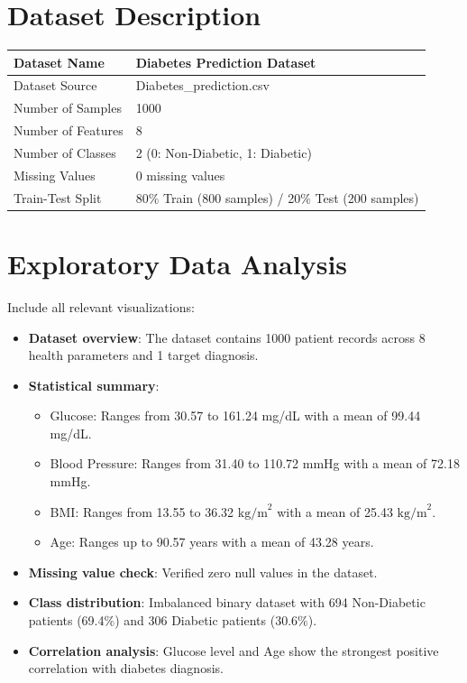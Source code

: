 \documentclass[12pt,a4paper]{article}
\begin{document}
\section{Dataset Description}
\begin{longtable}{|p{6cm}|p{8cm}|}
\hline
Dataset Name & Diabetes Prediction Dataset \\ \hline
Dataset Source & Diabetes\_prediction.csv \\ \hline
Number of Samples & 1000 \\ \hline
Number of Features & 8 \\ \hline
Number of Classes & 2 (0: Non-Diabetic, 1: Diabetic) \\ \hline
Missing Values & 0 missing values \\ \hline
Train-Test Split & 80\% Train (800 samples) / 20\% Test (200 samples) \\ \hline
\end{longtable}

\section{Exploratory Data Analysis}
Include all relevant visualizations:
\begin{itemize}
\item \textbf{Dataset overview}: The dataset contains 1000 patient records across 8 health parameters and 1 target diagnosis.
\item \textbf{Statistical summary}:
\begin{itemize}
\item Glucose: Ranges from 30.57 to 161.24 mg/dL with a mean of 99.44 mg/dL.
\item Blood Pressure: Ranges from 31.40 to 110.72 mmHg with a mean of 72.18 mmHg.
\item BMI: Ranges from 13.55 to 36.32 $\text{kg/m}^2$ with a mean of 25.43 $\text{kg/m}^2$.
\item Age: Ranges up to 90.57 years with a mean of 43.28 years.
\end{itemize}
\item \textbf{Missing value check}: Verified zero null values in the dataset.
\item \textbf{Class distribution}: Imbalanced binary dataset with 694 Non-Diabetic patients (69.4\%) and 306 Diabetic patients (30.6\%).
\item \textbf{Correlation analysis}: Glucose level and Age show the strongest positive correlation with diabetes diagnosis.
\end{itemize}
\end{document}
